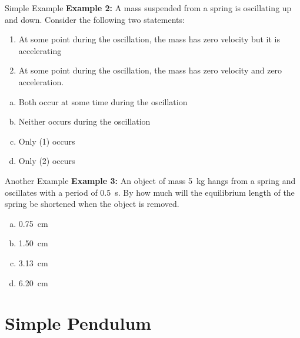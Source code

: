 \documentclass[12pt,compress,aspectratio=169]{beamer}
\begin{document}
\begin{frame}{Simple Example}
  \textbf{Example 2:} A mass suspended from a spring is oscillating up and
  down. Consider the following two statements:
  \begin{enumerate}
  \item At some point during the oscillation, the mass has zero velocity but it
    is accelerating
  \item At some point during the oscillation, the mass has zero velocity and
    zero acceleration.
  \end{enumerate}

  \begin{enumerate}[(a)]
  \item Both occur at some time during the oscillation
  \item Neither occurs during the oscillation
  \item Only (1) occurs
  \item Only (2) occurs
  \end{enumerate}
\end{frame}



\begin{frame}{Another Example}
  \textbf{Example 3:} An object of mass \SI{5}{\kilo\gram} hangs from a spring
  and oscillates with a period of \SI{.5}{\second}. By how much will the
  equilibrium length of the spring be shortened when the object is removed.
  \begin{enumerate}[(a)]
  \item\SI{0.75}{\centi\metre}
  \item\SI{1.50}{\centi\metre}
  \item\SI{3.13}{\centi\metre}
  \item\SI{6.20}{\centi\metre}
  \end{enumerate}
\end{frame}



\section{Simple Pendulum}
\end{document}
